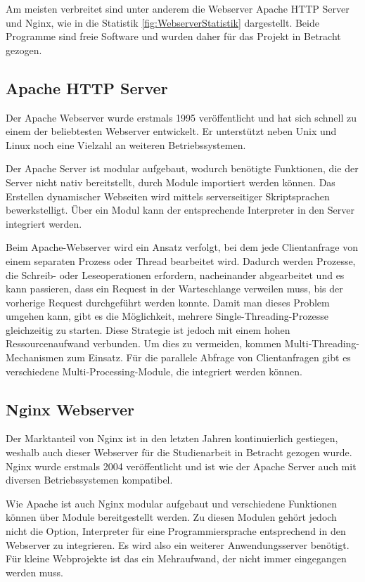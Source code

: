 Am meisten verbreitet sind unter anderem die Webserver Apache HTTP Server und Nginx, wie in die Statistik \ref{fig:WebserverStatistik} dargestellt. Beide Programme sind freie Software und wurden daher für das Projekt in Betracht gezogen. 

\subsection{Apache HTTP Server}
Der Apache Webserver wurde erstmals 1995 veröffentlicht und hat sich schnell zu einem der beliebtesten Webserver entwickelt. Er unterstützt neben Unix und Linux noch eine Vielzahl an weiteren Betriebssystemen.

Der Apache Server ist modular aufgebaut, wodurch benötigte Funktionen, die der Server nicht nativ bereitstellt, durch Module importiert werden können. Das Erstellen dynamischer Webseiten wird mittels serverseitiger Skriptsprachen bewerkstelligt. Über ein Modul kann der entsprechende Interpreter in den Server integriert werden.

Beim Apache-Webserver wird ein Ansatz verfolgt, bei dem jede Clientanfrage von einem separaten Prozess oder Thread bearbeitet wird. Dadurch werden Prozesse, die Schreib- oder Leseoperationen erfordern, nacheinander abgearbeitet und es kann passieren, dass ein Request in der Warteschlange verweilen muss, bis der vorherige Request durchgeführt werden konnte. Damit man dieses Problem umgehen kann, gibt es die Möglichkeit, mehrere Single-Threading-Prozesse gleichzeitig zu starten. Diese Strategie ist jedoch mit einem hohen Ressourcenaufwand verbunden. Um dies zu vermeiden, kommen Multi-Threading-Mechanismen zum Einsatz. Für die parallele Abfrage von Clientanfragen gibt es verschiedene Multi-Processing-Module, die integriert werden können.


\subsection{Nginx Webserver}
Der Marktanteil von Nginx ist in den letzten Jahren kontinuierlich gestiegen, weshalb auch dieser Webserver für die Studienarbeit in Betracht gezogen wurde. Nginx wurde erstmals 2004 veröffentlicht und ist wie der Apache Server auch mit diversen Betriebssystemen kompatibel.

Wie Apache ist auch Nginx modular aufgebaut und verschiedene Funktionen können über Module bereitgestellt werden. Zu diesen Modulen gehört jedoch nicht die Option, Interpreter für eine Programmiersprache entsprechend in den Webserver zu integrieren. Es wird also ein weiterer Anwendungsserver benötigt. Für kleine Webprojekte ist das ein Mehraufwand, der nicht immer eingegangen werden muss. 

